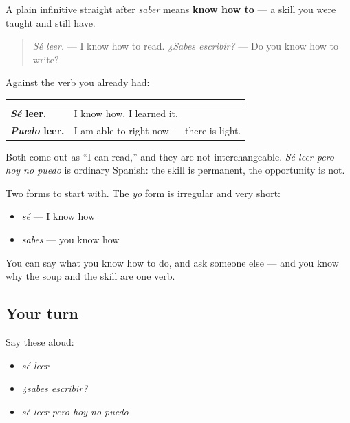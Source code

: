 \begin{grammarlens}[title={Grammar lens — saber plus an infinitive}]
A plain infinitive straight after \emph{saber} means \textbf{know how to} — a skill you were taught and still have.

\begin{quote}
\emph{Sé leer.} — I know how to read. \emph{¿Sabes escribir?} — Do you know how to write?
\end{quote}

Against the verb you already had:

\noindent
\begin{tabularx}{\linewidth}{@{}>{\raggedright\arraybackslash}X>{\raggedright\arraybackslash}X@{}}
\toprule
\textbf{} & \textbf{} \\
\midrule
\textbf{\emph{Sé} leer.} & I know how. I learned it. \\
\textbf{\emph{Puedo} leer.} & I am able to right now — there is light. \\
\bottomrule
\end{tabularx}

Both come out as \textquotedblleft{}I can read,\textquotedblright{} and they are not interchangeable. \emph{Sé leer pero hoy no puedo} is ordinary Spanish: the skill is permanent, the opportunity is not.

Two forms to start with. The \emph{yo} form is irregular and very short:

\begin{itemize}
\raggedright
  \item \emph{sé} — I know how
  \item \emph{sabes} — you know how
\end{itemize}
\end{grammarlens}

\begin{grammarlens}[title={What you've built}]
You can say what you know how to do, and ask someone else — and you know why the soup and the skill are one verb.
\end{grammarlens}

\subsection*{Your turn}
Say these aloud:

\begin{itemize}
\raggedright
  \item \emph{sé leer}
  \item \emph{¿sabes escribir?}
  \item \emph{sé leer pero hoy no puedo}
\end{itemize}

